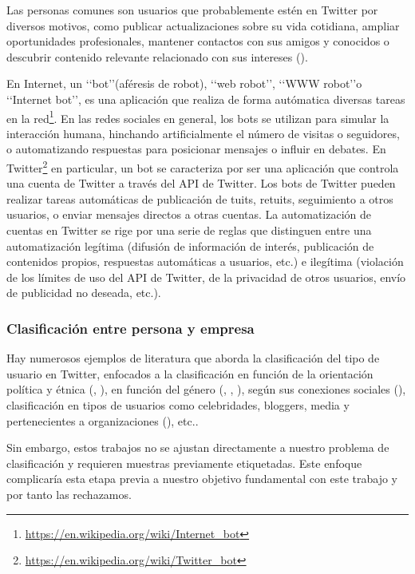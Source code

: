 Las personas comunes son usuarios que probablemente estén en Twitter por diversos motivos, 
como publicar actualizaciones sobre su vida cotidiana, ampliar oportunidades profesionales, 
mantener contactos con sus amigos y conocidos o descubrir contenido relevante relacionado con sus intereses
(\cite{user_class7}).

En Internet, un \lq\lq bot\rq\rq  (aféresis de robot), \lq\lq web robot\rq\rq, \lq\lq WWW robot\rq\rq o 
\lq\lq Internet bot\rq\rq, es una aplicación que realiza de forma autómatica diversas 
tareas en la red\footnote{\url{https://en.wikipedia.org/wiki/Internet_bot}}.
En las redes sociales en general, los bots se utilizan para simular la interacción humana, 
hinchando artificialmente el número de visitas o seguidores, o automatizando respuestas 
para posicionar mensajes o influir en debates.
En Twitter\footnote{\url{https://en.wikipedia.org/wiki/Twitter_bot}} en particular,
un bot se caracteriza por ser una aplicación que controla una cuenta de Twitter a través del
API de Twitter. Los bots de Twitter pueden realizar tareas automáticas de publicación de tuits,
retuits, seguimiento a otros usuarios, o enviar mensajes directos a otras cuentas. La automatización
de cuentas en Twitter se rige por una serie de reglas que distinguen entre una automatización 
legítima (difusión de información de interés, publicación de contenidos propios, respuestas automáticas
a usuarios, etc.) e ilegítima (violación de los límites de uso del API de Twitter, de la privacidad 
de otros usuarios, envío de publicidad no deseada, etc.).

\subsubsection{Clasificación entre persona y empresa}

Hay numerosos ejemplos de literatura que aborda la clasificación del tipo de usuario en Twitter, 
enfocados a la clasificación en función de la orientación política y étnica (\cite{user_class1},
\cite{user_class8}),  en función del género (\cite{user_class9}, \cite{user_class10}, 
\cite{user_class11}), según sus conexiones sociales (\cite{user_class12}), clasificación en
tipos de usuarios como celebridades, bloggers, media y pertenecientes a organizaciones 
(\cite{user_class12}), etc.. 

Sin embargo, estos trabajos no se ajustan directamente a nuestro problema de clasificación y  
requieren muestras previamente etiquetadas. Este enfoque complicaría esta etapa previa a 
nuestro objetivo fundamental con este trabajo y por tanto las rechazamos. 

